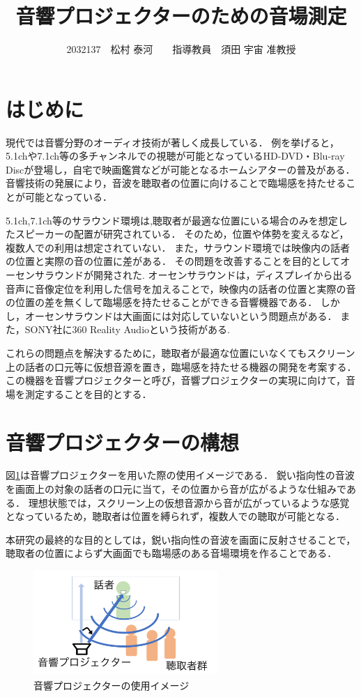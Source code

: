 \documentclass[twocolumn,10pt,a4j]{ltjsarticle}
\title{音響プロジェクターのための音場測定}
\author{2032137　松村 泰河　　指導教員　須田 宇宙 准教授}
\date{}
\begin{document}
\maketitle


\section{はじめに}
現代では音響分野のオーディオ技術が著しく成長している．
例を挙げると，5.1chや7.1ch等の多チャンネルでの視聴が可能となっているHD-DVD・Blu-ray Discが登場し，自宅で映画鑑賞などが可能となるホームシアターの普及がある．
音響技術の発展により，音波を聴取者の位置に向けることで臨場感を持たせることが可能となっている．

5.1ch,7.1ch等のサラウンド環境は,聴取者が最適な位置にいる場合のみを想定したスピーカーの配置が研究されている\cite{kurosumi1994}．
そのため，位置や体勢を変えるなど，複数人での利用は想定されていない．
また，サラウンド環境では映像内の話者の位置と実際の音の位置に差がある．
その問題を改善することを目的としてオーセンサラウンドが開発された\cite{authensurround}.
オーセンサラウンドは，ディスプレイから出る音声に音像定位を利用した信号を加えることで，映像内の話者の位置と実際の音の位置の差を無くして臨場感を持たせることができる音響機器である．
しかし，オーセンサラウンドは大画面には対応していないという問題点がある．
また，SONY社に360 Reality Audioという技術がある\cite{360RealityAudio}.


これらの問題点を解決するために，聴取者が最適な位置にいなくてもスクリーン上の話者の口元等に仮想音源を置き，臨場感を持たせる機器の開発を考案する．
この機器を音響プロジェクターと呼び，音響プロジェクターの実現に向けて，音場を測定することを目的とする．

\section{音響プロジェクターの構想}
図\ref{fig:音響プロジェクター}は音響プロジェクターを用いた際の使用イメージである．
鋭い指向性の音波を画面上の対象の話者の口元に当て，その位置から音が広がるような仕組みである．
理想状態では，スクリーン上の仮想音源から音が広がっているような感覚となっているため，聴取者は位置を縛られず，複数人での聴取が可能となる．

本研究の最終的な目的としては，鋭い指向性の音波を画面に反射させることで，聴取者の位置によらず大画面でも臨場感のある音場環境を作ることである．

\vspace{1ex}
\begin{figure}[h]
\begin{center}
 \includegraphics[clip,width=70mm,height=40mm]{onkyouP.pdf}
\end{center}
 \caption{音響プロジェクターの使用イメージ}
 \label{fig:音響プロジェクター}
\end{figure}
\end{document}

